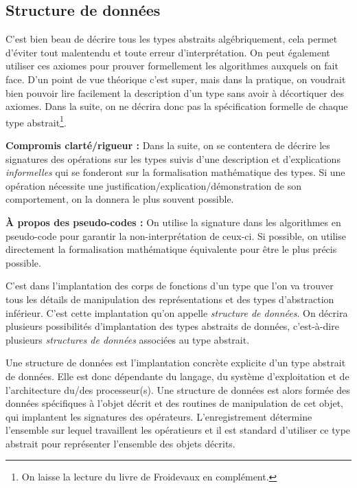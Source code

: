 \documentclass[../../../main.tex]{subfiles}
\begin{document}
\subsection{Structure de données}
C'est bien beau de décrire tous les types abstraits algébriquement, cela permet d'éviter tout malentendu et toute erreur d'interprétation. On peut également utiliser ces axiomes pour prouver formellement les algorithmes auxquels on fait face. D'un point de vue théorique c'est super, mais dans la pratique, on voudrait bien pouvoir lire facilement la description d'un type sans avoir à décortiquer des axiomes. Dans la suite, on ne décrira donc pas la spécification formelle de chaque type abstrait\footnote{On laisse la lecture du livre de Froidevaux \cite{Froidevaux} en complément.}.

\textbf{Compromis clarté/rigueur :} Dans la suite, on se contentera de décrire les signatures des opérations sur les types suivis d'une description et d'explications \textit{informelles} qui se fonderont sur la formalisation mathématique des types. Si une opération nécessite une justification/explication/démonstration de son comportement, on la donnera le plus souvent possible.

\textbf{À propos des pseudo-codes :} On utilise la signature dans les algorithmes en pseudo-code pour garantir la non-interprétation de ceux-ci. Si possible, on utilise directement la formalisation mathématique équivalente pour être le plus précis possible.

C'est dans l'implantation des corps de fonctions d'un type que l'on va trouver tous les détails de manipulation des représentations et des types d'abstraction inférieur. C'est cette implantation qu'on appelle \textit{structure de données}. On décrira plusieurs possibilités d'implantation des types abstraits de données, c'est-à-dire plusieurs \textit{structures de données} associées au type abstrait.

 {
	Une structure de données est l'implantation concrète explicite d'un type abstrait de données. Elle est donc dépendante du langage, du système d'exploitation et de l'architecture du/des processeur(s).
}
Une structure de données est alors formée des données spécifiques à l'objet décrit et des routines de manipulation de cet objet, qui implantent les signatures des opérateurs. L'enregistrement détermine l'ensemble sur lequel travaillent les opératieurs et il est standard d'utiliser ce type abstrait pour représenter l'ensemble des objets décrits.
\end{document}
